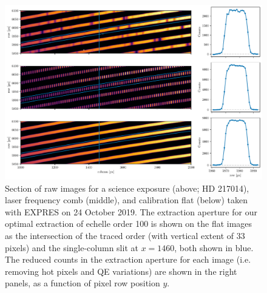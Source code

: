 \begin{figure}
    \centering
    \includegraphics[width=\textwidth]{figures-4/extraction.pdf}
    \caption{Section of raw images for a science exposure (above; HD 217014), laser frequency comb (middle), and calibration flat (below) taken with EXPRES on 24 October 2019. The extraction aperture for our optimal extraction of echelle order 100 is shown on the flat images as the intersection of the traced order (with vertical extent of 33 pixels) and the single-column slit at $x = 1460$, both shown in blue. The reduced counts in the extraction aperture for each image (i.e. removing hot pixels and QE variations) are shown in the right panels, as a function of pixel row position $y$.}
    \label{fig:extraction}
\end{figure}

